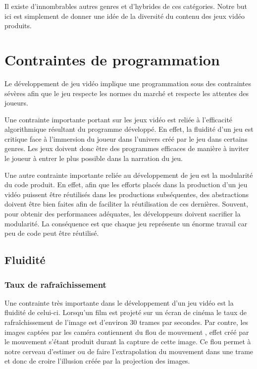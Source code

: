 \documentclass[12pt,oneside,letterpaper,francais]{book}
\begin{document}
Il existe d'innombrables autres genres et d'hybrides de ces
catégories. Notre but ici est simplement de donner une idée de la
diversité du contenu des jeux vidéo produits.



\section{Contraintes de programmation}

Le développement de jeu vidéo implique une programmation sous des
contraintes sévères afin que le jeu respecte les normes du marché
et respecte les attentes des joueurs.

Une contrainte importante portant sur les jeux vidéo est reliée à
l'efficacité algorithmique résultant du programme développé. En effet,
la fluidité d'un jeu est critique face à l'immersion du joueur dans
l'univers créé par le jeu dans certains genres. Les jeux doivent donc
être des programmes efficaces de manière à inviter le joueur à entrer
le plus possible dans la narration du jeu.

Une autre contrainte importante reliée au développement de jeu est la
modularité du code produit. En effet, afin que les efforts placés dans
la production d'un jeu vidéo puissent être réutilisés dans les
productions subséquentes, des abstractions doivent être bien faites
afin de faciliter la réutilisation de ces dernières. Souvent, pour
obtenir des performances adéquates, les développeurs doivent sacrifier
la modularité. La conséquence est que chaque jeu représente un énorme
travail car peu de code peut être réutilisé.


\subsection{Fluidité}


\subsubsection{Taux de rafraîchissement}
Une contrainte très importante dans le développement d'un jeu vidéo
est la fluidité de celui-ci. Lorsqu'un film est projeté sur un écran
de cinéma le taux de rafraîchissement de l'image est d'environ 30
trames par secondes. Par contre, les images captées par les caméra
contiennent du \og flou de mouvement \fg, effet créé par le mouvement
s'étant produit durant la capture de cette image. Ce flou permet à
notre cerveau d'estimer ou de faire l'extrapolation du mouvement dans
une trame et donc de croire l'illusion créée par la projection des
images.
\end{document}
